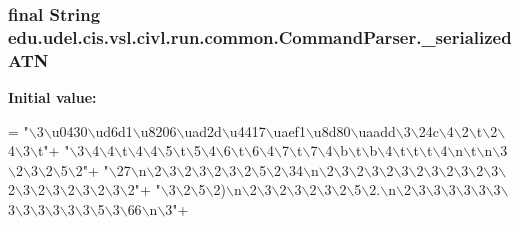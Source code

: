 \subsubsection[{\+\_\+serialized\+A\+T\+N}]{\setlength{\rightskip}{0pt plus 5cm}final String edu.\+udel.\+cis.\+vsl.\+civl.\+run.\+common.\+Command\+Parser.\+\_\+serialized\+A\+T\+N\hspace{0.3cm}{\ttfamily [static]}}\label{classedu_1_1udel_1_1cis_1_1vsl_1_1civl_1_1run_1_1common_1_1CommandParser_aaecd9980cd89da7cca098d105113bac8}
{\bfseries Initial value\+:}
\begin{DoxyCode}
=
        \textcolor{stringliteral}{"\(\backslash\)3\(\backslash\)u0430\(\backslash\)ud6d1\(\backslash\)u8206\(\backslash\)uad2d\(\backslash\)u4417\(\backslash\)uaef1\(\backslash\)u8d80\(\backslash\)uaadd\(\backslash\)3\(\backslash\)24c\(\backslash\)4\(\backslash\)2\(\backslash\)t\(\backslash\)2\(\backslash\)4\(\backslash\)3\(\backslash\)t"}+
        \textcolor{stringliteral}{"\(\backslash\)3\(\backslash\)4\(\backslash\)4\(\backslash\)t\(\backslash\)4\(\backslash\)4\(\backslash\)5\(\backslash\)t\(\backslash\)5\(\backslash\)4\(\backslash\)6\(\backslash\)t\(\backslash\)6\(\backslash\)4\(\backslash\)7\(\backslash\)t\(\backslash\)7\(\backslash\)4\(\backslash\)b\(\backslash\)t\(\backslash\)b\(\backslash\)4\(\backslash\)t\(\backslash\)t\(\backslash\)t\(\backslash\)4\(\backslash\)n\(\backslash\)t\(\backslash\)n\(\backslash\)3\(\backslash\)2\(\backslash\)3\(\backslash\)2\(\backslash\)5\(\backslash\)2"}+
        \textcolor{stringliteral}{"\(\backslash\)27\(\backslash\)n\(\backslash\)2\(\backslash\)3\(\backslash\)2\(\backslash\)3\(\backslash\)2\(\backslash\)3\(\backslash\)2\(\backslash\)5\(\backslash\)2\(\backslash\)34\(\backslash\)n\(\backslash\)2\(\backslash\)3\(\backslash\)2\(\backslash\)3\(\backslash\)2\(\backslash\)3\(\backslash\)2\(\backslash\)3\(\backslash\)2\(\backslash\)3\(\backslash\)2\(\backslash\)3\(\backslash\)2\(\backslash\)3\(\backslash\)2\(\backslash\)3\(\backslash\)2\(\backslash\)3\(\backslash\)2\(\backslash\)3\(\backslash\)2"}+
        \textcolor{stringliteral}{"\(\backslash\)3\(\backslash\)2\(\backslash\)5\(\backslash\)2)\(\backslash\)n\(\backslash\)2\(\backslash\)3\(\backslash\)2\(\backslash\)3\(\backslash\)2\(\backslash\)3\(\backslash\)2\(\backslash\)5\(\backslash\)2.\(\backslash\)n\(\backslash\)2\(\backslash\)3\(\backslash\)3\(\backslash\)3\(\backslash\)3\(\backslash\)3\(\backslash\)3\(\backslash\)3\(\backslash\)3\(\backslash\)3\(\backslash\)3\(\backslash\)3\(\backslash\)3\(\backslash\)5\(\backslash\)3\(\backslash\)66\(\backslash\)n\(\backslash\)3"}+

\end{DoxyCode}
